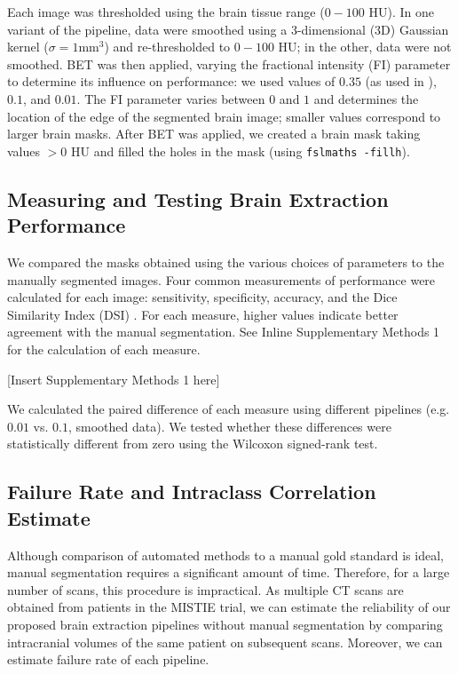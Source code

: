 \documentclass{elsarticle}\usepackage[]{graphicx}\usepackage[]{color}
\begin{document}
Each image was thresholded using the brain tissue range ($0-100$ HU).  In one variant of the pipeline, data were smoothed using a 3-dimensional (3D) Gaussian kernel ($\sigma=1$mm$^3$) and re-thresholded to $0-100$ HU; in the other, data were not smoothed.  BET was then applied, varying the fractional intensity (FI) parameter to determine its influence on performance: we used values of $0.35$ (as used in \citet{rorden_age-specific_2012}), $0.1$, and $0.01$.  The FI parameter varies between $0$ and $1$ and determines the location of the edge of the segmented brain image; smaller values correspond to larger brain masks. After BET was applied, we created a brain mask taking values $> 0$ HU and filled the holes in the mask (using \verb|fslmaths -fillh|).  


\subsection{Measuring and Testing Brain Extraction Performance}
We compared the masks obtained using the various choices of parameters to the manually segmented images.  Four common measurements of performance were calculated for each image: sensitivity, specificity, accuracy, and the Dice Similarity Index (DSI) \citep{dice_measures_1945}.  For each measure, higher values indicate better agreement with the manual segmentation.  See Inline Supplementary Methods 1 for the calculation of each measure.

[Insert Supplementary Methods 1 here]

We calculated the paired difference of each measure using different pipelines (e.g. $0.01$ vs. $0.1$, smoothed data).  We tested whether these differences were statistically different from zero using the Wilcoxon signed-rank test.



\subsection{Failure Rate and Intraclass Correlation Estimate}
Although comparison of automated methods to a manual gold standard is ideal, manual segmentation requires a significant amount of time.  Therefore, for a large number of scans, this procedure is impractical.  As multiple CT scans are obtained from patients in the MISTIE trial, we can estimate the reliability of our proposed brain extraction pipelines without manual segmentation by comparing intracranial volumes of the same patient on subsequent scans.  Moreover, we can estimate failure rate of each pipeline.  
\end{document}

